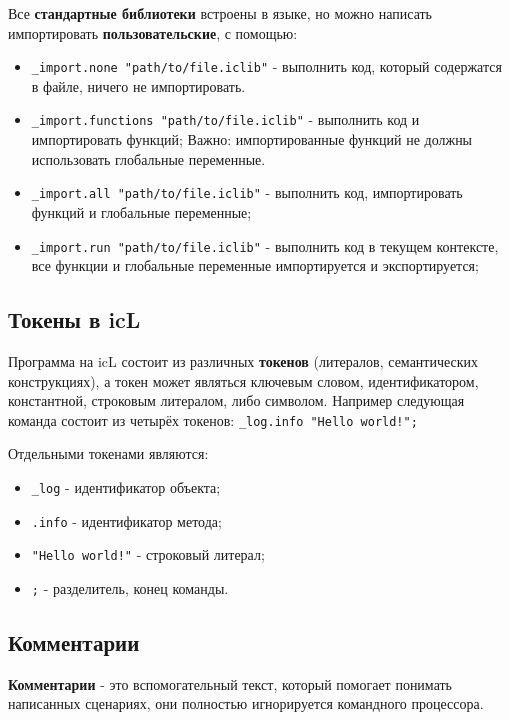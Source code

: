 \documentclass[a4paper, 14pt]{extarticle}
\newenvironment{icItems}
	{ \begin{itemize} [noitemsep,nolistsep] }
	{ \end{itemize} }
\begin{document}
Все \textbf{стандартные библиотеки} встроены в языке, но можно написать импортировать \textbf{пользовательские}, с помощью:

\begin{icItems}
	\item \lstinline`_import.none "path/to/file.iclib"` - выполнить код, который содержатся в файле, ничего не импортировать.
	\item \lstinline`_import.functions "path/to/file.iclib"` - выполнить код и импортировать функций; {\color{red}Важно:} импортированные функций не должны использовать глобальные переменные.
	\item \lstinline`_import.all "path/to/file.iclib"` -  выполнить код, импортировать функций и глобальные переменные;
	\item \lstinline`_import.run "path/to/file.iclib"` - выполнить код в текущем контексте, все функции и глобальные переменные импортируется и экспортируется;
\end{icItems}
	
\subsection{Токены в icL}
	
Программа на icL состоит из различных \textbf{токенов} (литералов, семантических конструкциях), а токен может являться ключевым словом, идентификатором, константной, строковым литералом, либо символом. Например следующая команда состоит из четырёх токенов: \lstinline`_log.info "Hello world!";`
	
Отдельными токенами являются:

\begin{icItems}
	\item \lstinline`_log` - идентификатор объекта;
	\item \lstinline`.info` - идентификатор метода;
	\item \lstinline`"Hello world!"` - строковый литерал;
	\item \lstinline`;` - разделитель, конец команды.
\end{icItems}
	
\subsection{Комментарии}
	
\textbf{Комментарии} - это вспомогательный текст, который помогает понимать написанных сценариях, они полностью игнорируется командного процессора. 
	
\end{document}
